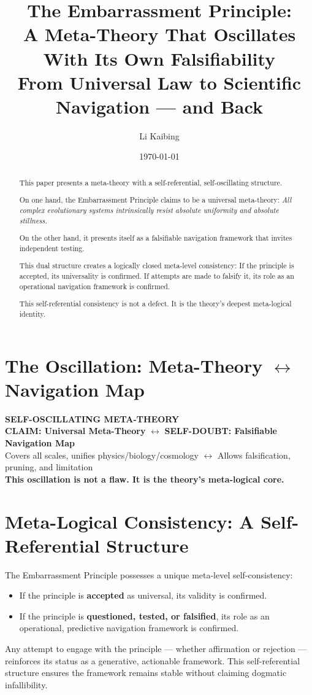 \documentclass[10pt,a4paper]{article}
\title{\textbf{The Embarrassment Principle:}\\
\textbf{A Meta-Theory That Oscillates With Its Own Falsifiability}\\[6pt]
{\large From Universal Law to Scientific Navigation --- and Back}}
\author{Li Kaibing}
\date{\today}
\begin{document}
\maketitle

\begin{abstract}
This paper presents a meta-theory with a self-referential, self-oscillating structure.

On one hand, the Embarrassment Principle claims to be a universal meta-theory:
\textit{All complex evolutionary systems intrinsically resist absolute uniformity and absolute stillness.}

On the other hand, it presents itself as a falsifiable navigation framework that invites independent testing.

This dual structure creates a logically closed meta-level consistency:
If the principle is accepted, its universality is confirmed.
If attempts are made to falsify it, its role as an operational navigation framework is confirmed.

This self-referential consistency is not a defect. It is the theory’s deepest meta-logical identity.
\end{abstract}

\section*{The Oscillation: Meta-Theory $\leftrightarrow$ Navigation Map}
\begin{center}
\textbf{\large SELF-OSCILLATING META-THEORY}\\[4pt]
\textbf{CLAIM: Universal Meta-Theory} \quad $\leftrightarrow$ \quad \textbf{SELF-DOUBT: Falsifiable Navigation Map}\\[4pt]
\small Covers all scales, unifies physics/biology/cosmology \quad $\leftrightarrow$ \quad Allows falsification, pruning, and limitation\\[4pt]
\textbf{\large This oscillation is not a flaw. It is the theory’s meta-logical core.}
\end{center}

\section*{Meta-Logical Consistency: A Self-Referential Structure}
The Embarrassment Principle possesses a unique meta-level self-consistency:
\begin{itemize}
\item If the principle is \textbf{accepted} as universal, its validity is confirmed.
\item If the principle is \textbf{questioned, tested, or falsified}, its role as an operational, predictive navigation framework is confirmed.
\end{itemize}
Any attempt to engage with the principle --- whether affirmation or rejection ---
reinforces its status as a generative, actionable framework.
This self-referential structure ensures the framework remains stable
without claiming dogmatic infallibility.
\end{document}
